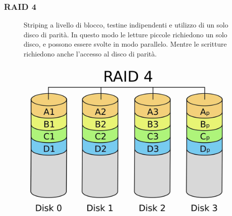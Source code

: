 \subsubsection*{RAID 4}
\begin{figure}[H]
    \centering
    \begin{minipage}{0.65\textwidth}
        Striping a livello di blocco, testine indipendenti e utilizzo di un solo disco di parità.
        In questo modo le letture piccole richiedono un solo disco, e possono essere svolte in modo parallelo. Mentre le scritture richiedono anche l'accesso al disco di parità.
    \end{minipage}
    \hfill
    \begin{minipage}{0.3\textwidth}
        \centering
        \includegraphics[width=1\linewidth]{assets/RAID_4.jpeg}
    \end{minipage}
\end{figure}

